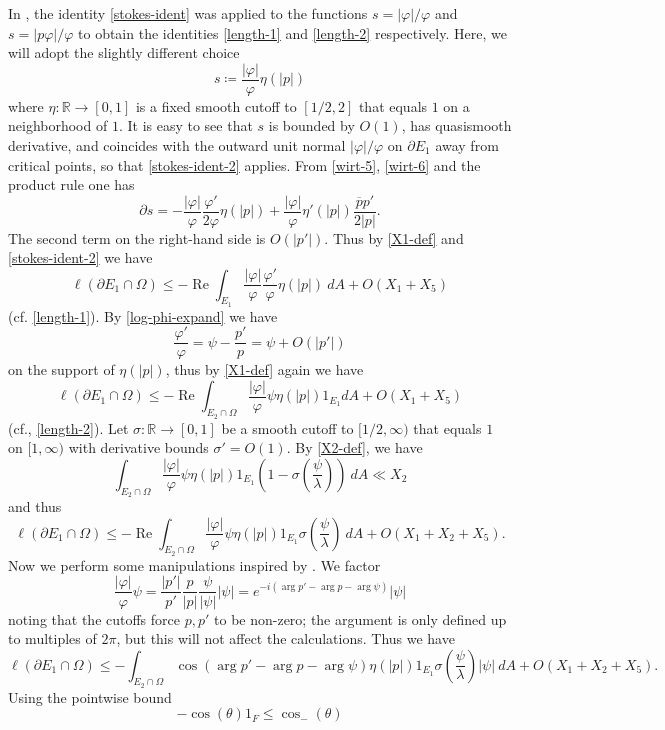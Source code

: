 \documentclass[12pt]{amsart}
\newcommand{\R}{\mathbb{R}}
\renewcommand{\arg}{\operatorname{arg}}
\renewcommand{\Re}{\operatorname{Re}}
\begin{document}
In \cite{fryntov}, the identity \eqref{stokes-ident} was applied to the functions $s = |\varphi|/\varphi$ and $s = |p\varphi|/\varphi$ to obtain the identities \eqref{length-1} and \eqref{length-2} respectively.  Here, we will adopt the slightly different choice
$$ s \coloneqq \frac{|\varphi|}{\varphi} \eta(|p|)$$
where $\eta: \R \to [0,1]$ is a fixed smooth cutoff to $[1/2,2]$ that equals $1$ on a neighborhood of $1$.
It is easy to see that $s$ is bounded by $O(1)$, has quasismooth derivative, and coincides with the outward unit normal $|\varphi|/\varphi$ on $\partial E_1$ away from critical points, so that \eqref{stokes-ident-2} applies.
From \eqref{wirt-5}, \eqref{wirt-6} and the product rule one has
$$
\partial s = -\frac{|\varphi|}{\varphi} \frac{\varphi'}{2\varphi} \eta(|p|) + \frac{|\varphi|}{\varphi} \eta'(|p|) \frac{\overline{p} p'}{2|p|}.
$$
The second term on the right-hand side is $O(|p'|)$.  Thus by \eqref{X1-def} and \eqref{stokes-ident-2} we have
$$ \ell(\partial E_1 \cap \Omega) \leq - \Re \int_{E_1} \frac{|\varphi|}{\varphi} \frac{\varphi'}{\varphi} \eta(|p|)\ dA + O( X_1 + X_5 )$$
(cf. \eqref{length-1}).
By \eqref{log-phi-expand} we have
$$ \frac{\varphi'}{\varphi} = \psi - \frac{p'}{p} = \psi + O(|p'|)$$
on the support of $\eta(|p|)$, thus by \eqref{X1-def} again we have
$$ \ell(\partial E_1 \cap \Omega) \leq - \Re \int_{E_2 \cap \Omega} \frac{|\varphi|}{\varphi} \psi \eta(|p|) 1_{E_1} dA + O( X_1 + X_5 )$$
(cf., \eqref{length-2}).
  Let $\sigma: \R \to [0,1]$ be a smooth cutoff to $[1/2,\infty)$ that equals $1$ on $[1,\infty)$ with derivative bounds $\sigma' = O(1)$.
By \eqref{X2-def}, we have
$$ \int_{E_2 \cap \Omega} \frac{|\varphi|}{\varphi} \psi \eta(|p|) 1_{E_1} \left(1-\sigma\left(\frac{\psi}{\lambda}\right)\right) \ dA \ll X_2$$
and thus
$$ \ell(\partial E_1 \cap \Omega) \leq - \Re \int_{E_2 \cap \Omega} \frac{|\varphi|}{\varphi} \psi \eta(|p|) 1_{E_1} \sigma\left(\frac{\psi}{\lambda}\right)\ dA + O( X_1 + X_2 + X_5 ).$$
Now we perform some manipulations inspired by \cite[\S 9]{fryntov}.  We factor
$$ \frac{|\varphi|}{\varphi} \psi = \frac{|p'|}{p'} \frac{p}{|p|} \frac{\psi}{|\psi|} |\psi| = e^{-i (\arg p' - \arg p - \arg \psi)} |\psi|$$
noting that the cutoffs force $p,p'$ to be non-zero; the argument is only defined up to multiples of $2\pi$, but this will not affect the calculations.  Thus we have
$$ \ell(\partial E_1 \cap \Omega) \leq - \int_{E_2 \cap \Omega} \cos(\arg p' - \arg p - \arg \psi) \eta(|p|) 1_{E_1} \sigma\left(\frac{\psi}{\lambda}\right) |\psi|\ dA + O( X_1 + X_2 + X_5 ).$$
Using the pointwise bound
$$ -\cos(\theta) 1_F \leq \cos_-(\theta)$$
\end{document}
